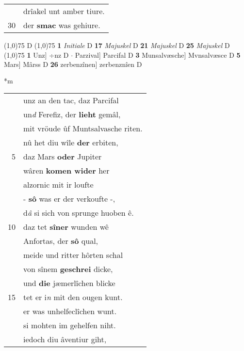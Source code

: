 \documentclass[8pt,a4paper,notitlepage]{article}
\begin{document}
\begin{table}[ht]
\begin{minipage}[t]{0.5\linewidth}
\begin{tabular}{rl}
 & drîakel unt amber tiure.\\ 
30 & der \textbf{smac} was gehiure.\\ 
\end{tabular}
\scriptsize
\line(1,0){75} \newline
D \newline
\line(1,0){75} \newline
\textbf{1} \textit{Initiale} D  \textbf{17} \textit{Majuskel} D  \textbf{21} \textit{Majuskel} D  \textbf{25} \textit{Majuskel} D  \newline
\line(1,0){75} \newline
\textbf{1} Unz] ÷nz D  $\cdot$ Parzival] Parcifal D \textbf{3} Munsalvæsche] Mvnsalvæsce D \textbf{5} Mars] Mârss D \textbf{26} zerbenzînen] zerbenznîen D \newline
\end{minipage}
\hspace{0.5cm}
\begin{minipage}[t]{0.5\linewidth}
\small
\begin{center}*m
\end{center}
\begin{tabular}{rl}
 & unz an den tac, daz Parcifal\\ 
 & un\textit{d} Ferefiz, der \textbf{lieht} gemâl,\\ 
 & mit vröude ûf Muntsalvasche riten.\\ 
 & nû het diu wîle \textbf{der} erbiten,\\ 
5 & daz Mars \textbf{oder} Jupiter\\ 
 & wâren \textbf{komen wider} her\\ 
 & alzornic mit ir loufte\\ 
 & - \textbf{sô} was er der verkoufte -,\\ 
 & d\textit{â} si sich von sprunge huoben ê.\\ 
10 & daz tet \textbf{sîner} wunden wê\\ 
 & Anfortas, der \textbf{sô} qual,\\ 
 & meide und ritter hôrten schal\\ 
 & von sînem \textbf{geschrei} dicke,\\ 
 & und \textbf{die} jæmerlîchen blicke\\ 
15 & tet er i\textit{n} mit den ougen kunt.\\ 
 & er was unhelfeclîchen wunt.\\ 
 & si mohten im gehelfen niht.\\ 
 & iedoch diu âventiur giht,\\ 

\end{tabular}
\end{minipage}
\end{table}
\end{document}
